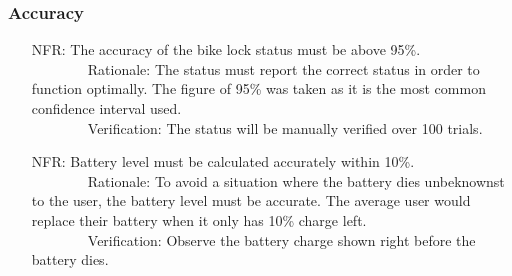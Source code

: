 \documentclass[12pt]{article}
\newcounter{nfrnum} %
\begin{document}
\subsubsection{Accuracy}
\begin{itemize}
\setlength{\itemindent}{.5in}
\item[NFR\refstepcounter{nfrnum}\thenfrnum\label{NFRAccuracyStatus}:] The accuracy of the bike lock status must be above 95\%.
\\ \-\ \-\ \-\ \-\ \-\ \-\ \-\ \-\ Rationale: The status must report the correct status in order to function optimally. The figure of 95\% was taken as it is the most common confidence interval used. 
\\ \-\ \-\ \-\ \-\ \-\ \-\ \-\ \-\ Verification: The status will be manually verified over 100 trials. 
 
\item[NFR\refstepcounter{nfrnum}\thenfrnum\label{NFRBatteryLevel}:] Battery level must be calculated accurately within 10\%.
\\ \-\ \-\ \-\ \-\ \-\ \-\ \-\ \-\ Rationale: To avoid a situation where the battery dies unbeknownst to the user, the battery level must be accurate. The average user would replace their battery when it only has 10\% charge left.
\\ \-\ \-\ \-\ \-\ \-\ \-\ \-\ \-\ Verification: Observe the battery charge shown right before the battery dies. 
\end{itemize}
\end{document}
